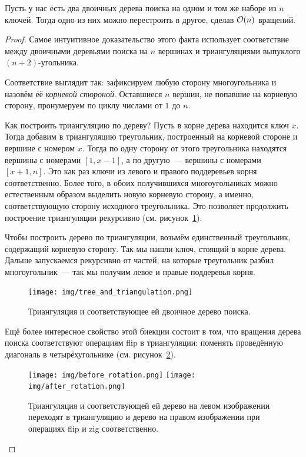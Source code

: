 \begin{lemma}\label{tree_distance} Пусть у нас есть два двоичных дерева поиска на одном и том же наборе из $n$ ключей. Тогда одно из них можно перестроить в другое, сделав $\mathcal{O}(n)$ вращений.
\end{lemma}
\begin{proof} Самое интуитивное доказательство этого факта использует соответствие
	между двоичными деревьями поиска на $n$ вершинах и триангуляциями выпуклого $(n + 2)$-угольника.

	Соответствие выглядит так: зафиксируем любую сторону многоугольника и назовём её \emph{корневой стороной}. Оставшиеся $n$ вершин, не попавшие на корневую сторону,
	пронумеруем по циклу числами от $1$ до $n$.

	Как построить триангуляцию по дереву?
	Пусть в корне дерева находится ключ $x$. Тогда добавим в триангуляцию треугольник, построенный на корневой стороне и вершине с номером $x$. Тогда по одну сторону от этого
	треугольника находятся вершины с номерами $[1, x - 1]$, а по другую~---
	вершины с номерами $[x + 1, n]$. Это как раз ключи из левого и правого поддеревьев
	корня соответственно. Более того, в обоих получившихся многоугольниках можно естественным образом выделить новую корневую сторону, а именно, соответствующую сторону исходного треугольника. Это позволяет продолжить построение триангуляции рекурсивно (см. рисунок~\ref{triangulation_tree}).

	Чтобы построить дерево по триангуляции, возьмём единственный треугольник, содержащий корневую сторону. Так мы нашли ключ, стоящий в корне дерева. Дальше запускаемся рекурсивно от частей, на которые треугольник разбил многоугольник~--- так мы получим левое и правые поддеревья корня.
	\begin{figure} \centering
		\texttt{[image: img/tree\_and\_triangulation.png]}
		\caption{Триангуляция и соответствующее ей двоичное дерево поиска.}
		\label{triangulation_tree}
	\end{figure}

	Ещё более интересное свойство этой биекции состоит в том, что вращения дерева поиска соответствуют операциям \textrm{flip} в триангуляции: поменять проведённую диагональ
	в четырёхугольнике (см. рисунок~\ref{rotate_and_flip}).
	\begin{figure} \centering
		\texttt{[image: img/before\_rotation.png]}
		\hspace{0.1\textwidth}
		\texttt{[image: img/after\_rotation.png]}
		\caption{Триангуляция и соответствующей ей дерево на левом изображении
			переходят в триангуляцию и дерево на правом изображении при операциях
			\textrm{flip} и \textrm{zig} соответственно.}
		\label{rotate_and_flip}
	\end{figure}


\end{proof}
